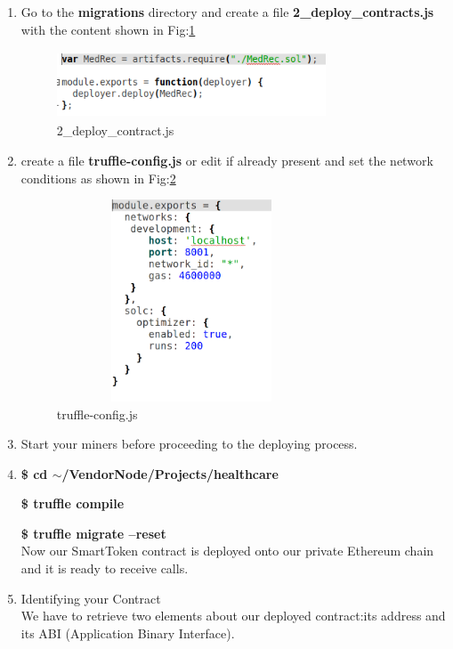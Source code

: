 \documentclass[journal,12pt,twocolumn]{IEEEtran}
\begin{document}
\begin{enumerate}
 \item Go to the \textbf{migrations} directory and create a file \textbf{2\_deploy\_contracts.js} with the content shown in Fig:\ref{fig:5}
 
  \begin{figure}[H]
  \includegraphics[width=8cm, height=2cm]{deploy.png}
  \caption{2\_deploy\_contract.js}
  \label{fig:5}
\end{figure} 
 
 \item create a file \textbf{truffle-config.js} or edit if already present and set the network conditions as shown in Fig:\ref{fig:6}\\
 
  \begin{figure}[H]
  \includegraphics[width=8cm, height=6cm]{truffle.png}
  \caption{truffle-config.js}
  \label{fig:6}
\end{figure} 

 \item Start your miners before proceeding to the deploying process.
 
 \item \textbf{\$ cd $\sim$/VendorNode/Projects/healthcare}

       \textbf{\$ truffle compile}

       \textbf{\$ truffle migrate --reset} \\
Now our SmartToken contract is deployed onto our private Ethereum chain and it is ready to receive calls.

 \item Identifying your Contract\\
We have to retrieve two elements about our deployed contract:its address
and its ABI (Application Binary Interface).


\end{enumerate}
\end{document}

